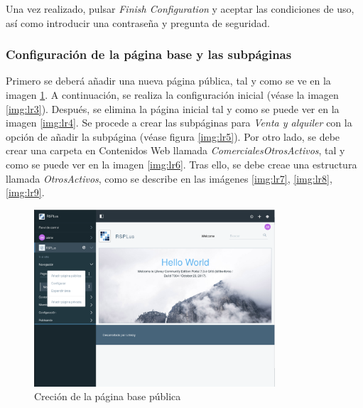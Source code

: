\par Una vez realizado, pulsar \textit{Finish Configuration} y aceptar las condiciones de uso, así como introducir una contraseña y pregunta de seguridad.

\subsubsection{Configuración de la página base y las subpáginas}
\par Primero se deberá añadir una nueva página pública, tal y como se ve en la imagen \ref{img:lr2}. A continuación, se realiza la configuración inicial (véase la imagen \ref{img:lr3}). Después, se elimina la página inicial tal y como se puede ver en la imagen \ref{img:lr4}. Se procede a crear las subpáginas para \textit{Venta y alquiler} con la opción de añadir la subpágina (véase figura \ref{img:lr5}). Por otro lado, se debe crear una carpeta en Contenidos Web llamada \textit{ComercialesOtrosActivos}, tal y como se puede ver en la imagen \ref{img:lr6}. Tras ello, se debe creae una estructura llamada \textit{OtrosActivos}, como se describe en las imágenes \ref{img:lr7}, \ref{img:lr8}, \ref{img:lr9}.

\begin{figure}[H]
\begin{center}
\includegraphics[width=0.8\textwidth]{./img/liferay/2.png}
\end{center}
\caption{Creción de la página base pública}
\label{img:lr2}
\end{figure}

